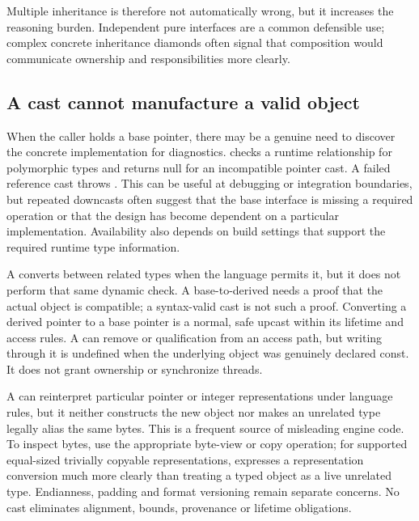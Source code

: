Multiple inheritance is therefore not automatically wrong, but it increases the reasoning burden. Independent pure interfaces are a common defensible use; complex concrete inheritance diamonds often signal that composition would communicate ownership and responsibilities more clearly.

\subsection{A cast cannot manufacture a valid object}\label{05-engine-i-ch004-a-cast-cannot-manufacture-a-valid-object}

\hypertarget{05-engine-i-ch004-a-cast-cannot-manufacture-a-valid-object}{}

When the caller holds a base pointer, there may be a genuine need to discover the concrete implementation for diagnostics.  checks a runtime relationship for polymorphic types and returns null for an incompatible pointer cast. A failed reference cast throws . This can be useful at debugging or integration boundaries, but repeated downcasts often suggest that the base interface is missing a required operation or that the design has become dependent on a particular implementation. Availability also depends on build settings that support the required runtime type information.

A  converts between related types when the language permits it, but it does not perform that same dynamic check. A base-to-derived  needs a proof that the actual object is compatible; a syntax-valid cast is not such a proof. Converting a derived pointer to a base pointer is a normal, safe upcast within its lifetime and access rules. A  can remove  or  qualification from an access path, but writing through it is undefined when the underlying object was genuinely declared const. It does not grant ownership or synchronize threads.

A  can reinterpret particular pointer or integer representations under language rules, but it neither constructs the new object nor makes an unrelated type legally alias the same bytes. This is a frequent source of misleading engine code. To inspect bytes, use the appropriate byte-view or copy operation; for supported equal-sized trivially copyable representations,  expresses a representation conversion much more clearly than treating a typed object as a live unrelated type. Endianness, padding and format versioning remain separate concerns. No cast eliminates alignment, bounds, provenance or lifetime obligations.

